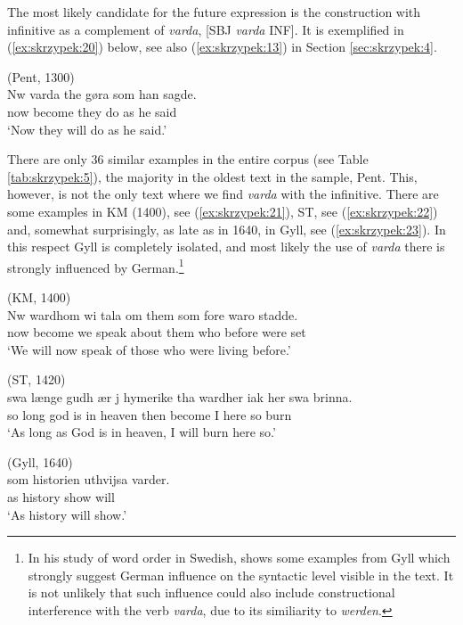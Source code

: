 \documentclass[output=paper,colorlinks,citecolor=brown]{langscibook}
\begin{document}
The most likely candidate for the future expression is the construction with infinitive as a complement of \textit{varda}, [SBJ \textit{varda} INF]. It is exemplified in (\ref{ex:skrzypek:20}) below, see also (\ref{ex:skrzypek:13}) in Section \ref{sec:skrzypek:4}. 

\ea \label{ex:skrzypek:20}
    (Pent, 1300)\\
    \gll Nw varda the gøra som han sagde.\\
    now become they do as he said\\
    \glt ‘Now they will do as he said.’
\z

There are only 36 similar examples in the entire corpus (see Table \ref{tab:skrzypek:5}), the majority in the oldest text in the sample, Pent. This, however, is not the only text where we find \textit{varda} with the infinitive. There are some examples in KM (1400), see (\ref{ex:skrzypek:21}), ST, see (\ref{ex:skrzypek:22}) and, somewhat surprisingly, as late as in 1640, in Gyll, see (\ref{ex:skrzypek:23}). In this respect Gyll is completely isolated, and most likely the use of \textit{varda} there is strongly influenced by German.\footnote{In his study of word order in Swedish, \citet[]{MagnussonPetzell2014} shows some examples from Gyll which strongly suggest German influence on the syntactic level visible in the text. It is not unlikely that such influence could also include constructional interference with the verb \textit{varda}, due to its similiarity to \textit{werden}.}

\ea \label{ex:skrzypek:21}
    (KM, 1400)\\
    \gll Nw wardhom wi tala om them som fore waro stadde.\\
    now become we speak about them who before were set\\
    \glt ‘We will now speak of those who were living before.’
\z

\ea \label{ex:skrzypek:22}
    (ST, 1420)\\
    \gll swa længe gudh ær j hymerike tha wardher iak her swa brinna.\\
    so long god is in heaven then become I here so burn\\
    \glt ‘As long as God is in heaven, I will burn here so.’
\z

\ea \label{ex:skrzypek:23}
    (Gyll, 1640)\\
    \gll som historien uthvijsa varder.\\
    as history show will\\
    \glt ‘As history will show.’
\z
\end{document}
